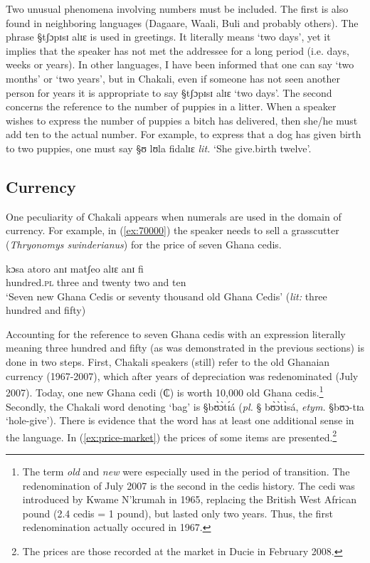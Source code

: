 Two unusual phenomena involving numbers must be included. The first is
also found in neighboring languages (Dagaare, Waali, Buli and probably others). 
The phrase {\S tʃɔpɪsɪ alɪɛ} is used in greetings.   It literally means `two
days', yet it implies that the speaker has not met the addressee for a long
period  (i.e. days, weeks or years). In other languages, I have been informed 
that one
can say `two months' or `two years', but in Chakali, even if someone has not
seen another person for years it is appropriate to say  {\S tʃɔpɪsɪ alɪɛ} `two
days'. The second concerns the reference to the number of puppies in a litter.
When a
speaker wishes to express the number of puppies a bitch has delivered, then
she/he
must add ten to the actual number. For example,  to express that a dog has given
birth to two puppies, one must say {\S ʊ lʊla fidalɪɛ}  {\it lit.} `She
give.birth twelve'. 




\subsection{Currency}
\label{sec:NUM-currency}

One peculiarity of Chakali appears when numerals are used in the domain of
currency. For example,  in (\ref{ex:70000}) the speaker needs to sell a
grasscutter (\textit{Thryonomys swinderianus}) for the price of seven Ghana
cedis.


\begin{exe}
\ex\label{ex:70000}
\gll kɔsa atoro anɪ matʃeo alɪɛ anɪ fi\\
 hundred.\textsc{pl} three and twenty two and ten\\
\glt `Seven new Ghana Cedis or seventy thousand old Ghana Cedis' ({\it lit:}
three
hundred and fifty)\\
\end{exe} 


Accounting for the reference to seven Ghana cedis with an expression literally
meaning three hundred and fifty (as was demonstrated in the previous
sections) is done in two steps.  First, Chakali speakers (still) refer
to the old Ghanaian currency (1967-2007), which after years of depreciation was
redenominated (July 2007). Today,  one new Ghana cedi ({\W ₵}) is worth 10,000
old Ghana cedis.\footnote{The term \textit{old} and \textit{new} were especially
used in the period of transition. The redenomination of July 2007 is the second
in the cedis history. The cedi was introduced by Kwame N'krumah in 1965,
replacing the British West African pound (2.4 cedis = 1 pound), but lasted only
two years. Thus,  the first redenomination actually occured in 1967.}  Secondly,
the Chakali word denoting `bag'  is {\S bʊ̀ɔ̀tɪ́á} (\textit{pl.} {\S
bʊ̀ɔ̀tɪ̀sá},  \textit{etym.}  {\S bʊɔ-tɪa} `hole-give').  There is evidence
that the word has at least one additional sense in the language. In
(\ref{ex:price-market}) the prices of some items are presented.\footnote{The
prices are those recorded at the market in Ducie in
February 2008.}


